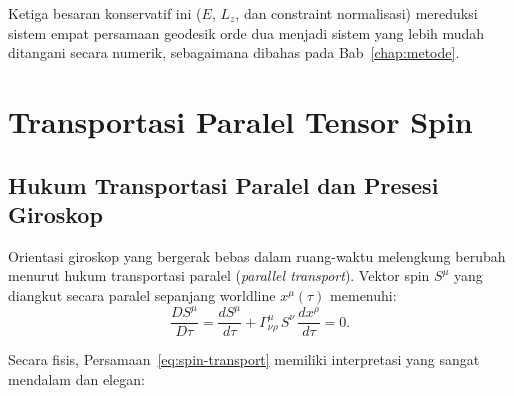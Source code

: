 Ketiga besaran konservatif ini ($E$, $L_z$, dan constraint normalisasi) mereduksi sistem empat persamaan geodesik orde dua menjadi sistem yang lebih mudah ditangani secara numerik, sebagaimana dibahas pada Bab~\ref{chap:metode}.


\section{Transportasi Paralel Tensor Spin}
\label{sec:transportasi-paralel}

\subsection{Hukum Transportasi Paralel dan Presesi Giroskop}
\label{subsec:transport-paralel-hukum}

Orientasi giroskop yang bergerak bebas dalam ruang-waktu melengkung berubah menurut hukum transportasi paralel (\textit{parallel transport}). Vektor spin $S^\mu$ yang diangkut secara paralel sepanjang worldline $x^\mu(\tau)$ memenuhi:
\begin{equation}
    \frac{DS^\mu}{D\tau} = \frac{dS^\mu}{d\tau}
    + \Gamma^\mu_{\nu\rho}\, S^\nu\, \frac{dx^\rho}{d\tau} = 0.
    \label{eq:spin-transport}
\end{equation}

Secara fisis, Persamaan~\eqref{eq:spin-transport} memiliki interpretasi yang sangat mendalam dan elegan:

